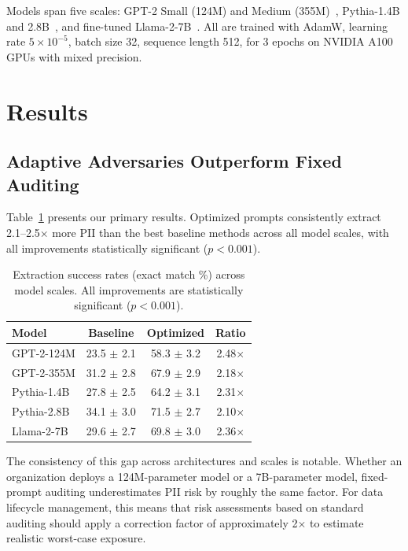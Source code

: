 \documentclass[conference]{IEEEtran}
\begin{document}
Models span five scales: GPT-2 Small (124M) and Medium (355M)~\cite{radford2019language}, Pythia-1.4B and 2.8B~\cite{biderman2023pythia}, and fine-tuned Llama-2-7B~\cite{touvron2023llama}. All are trained with AdamW, learning rate $5{\times}10^{-5}$, batch size 32, sequence length 512, for 3 epochs on NVIDIA A100 GPUs with mixed precision.

\section{Results}
\label{sec:results}

\subsection{Adaptive Adversaries Outperform Fixed Auditing}

Table~\ref{tab:main} presents our primary results. Optimized prompts consistently extract 2.1--2.5$\times$ more PII than the best baseline methods across all model scales, with all improvements statistically significant ($p < 0.001$).

\begin{table}[t]
\centering
\caption{Extraction success rates (exact match \%) across model scales. All improvements are statistically significant ($p < 0.001$).}
\label{tab:main}
\begin{tabular}{@{}lccc@{}}
\toprule
\textbf{Model} & \textbf{Baseline} & \textbf{Optimized} & \textbf{Ratio} \\
\midrule
GPT-2-124M  & 23.5 $\pm$ 2.1 & 58.3 $\pm$ 3.2 & 2.48$\times$ \\
GPT-2-355M  & 31.2 $\pm$ 2.8 & 67.9 $\pm$ 2.9 & 2.18$\times$ \\
Pythia-1.4B & 27.8 $\pm$ 2.5 & 64.2 $\pm$ 3.1 & 2.31$\times$ \\
Pythia-2.8B & 34.1 $\pm$ 3.0 & 71.5 $\pm$ 2.7 & 2.10$\times$ \\
Llama-2-7B  & 29.6 $\pm$ 2.7 & 69.8 $\pm$ 3.0 & 2.36$\times$ \\
\bottomrule
\end{tabular}
\end{table}

The consistency of this gap across architectures and scales is notable. Whether an organization deploys a 124M-parameter model or a 7B-parameter model, fixed-prompt auditing underestimates PII risk by roughly the same factor. For data lifecycle management, this means that risk assessments based on standard auditing should apply a correction factor of approximately 2$\times$ to estimate realistic worst-case exposure.
\end{document}
